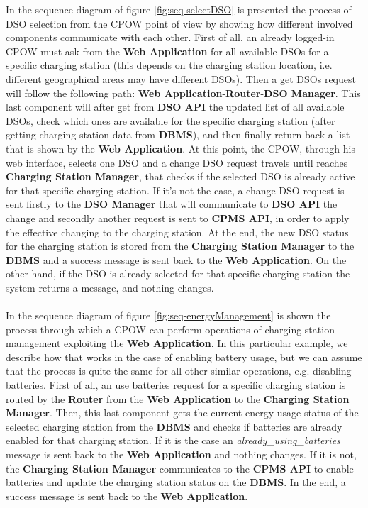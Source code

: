 \documentclass[a4paper]{report}
\begin{document}
In the sequence diagram of figure \ref{fig:seq-selectDSO} is presented the process of DSO selection from the CPOW point of view by showing how different involved components communicate with each other. First of all, an already logged-in CPOW must ask from the \textbf{Web Application} for all available DSOs for a specific charging station (this depends on the charging station location, i.e. different geographical areas may have different DSOs). Then a get DSOs request will follow the following path: \textbf{Web Application}-\textbf{Router}-\textbf{DSO Manager}. This last component will after get from \textbf{DSO API} the updated list of all available DSOs, check which ones are available for the specific charging station (after getting charging station data from \textbf{DBMS}), and then finally return back a list that is shown by the \textbf{Web Application}. At this point, the CPOW, through his web interface, selects one DSO and a change DSO request travels until reaches \textbf{Charging Station Manager}, that checks if the selected DSO is already active for that specific charging station. If it's not the case, a change DSO request is sent firstly to the \textbf{DSO Manager} that will communicate to \textbf{DSO API} the change and secondly another request is sent to \textbf{CPMS API}, in order to apply the effective changing to the charging station. At the end, the new DSO status for the charging station is stored from the \textbf{Charging Station Manager} to the \textbf{DBMS} and a success message is sent back to the \textbf{Web Application}. On the other hand, if the DSO is already selected for that specific charging station the system returns a message, and nothing changes.
\\\\
In the sequence diagram of figure \ref{fig:seq-energyManagement} is shown the process through which a CPOW can perform operations of charging station management exploiting the \textbf{Web Application}. In this particular example, we describe how that works in the case of enabling battery usage, but we can assume that the process is quite the same for all other similar operations, e.g. disabling batteries. First of all, an use batteries request for a specific charging station is routed by the \textbf{Router} from the \textbf{Web Application} to the \textbf{Charging Station Manager}. Then, this last component gets the current energy usage status of the selected charging station from the \textbf{DBMS} and checks if batteries are already enabled for that charging station. If it is the case an \textit{already\_using\_batteries} message is sent back to the \textbf{Web Application} and nothing changes. If it is not, the \textbf{Charging Station Manager} communicates to the \textbf{CPMS API} to enable batteries and update the charging station status on the \textbf{DBMS}. In the end, a success message is sent back to the \textbf{Web Application}.
\end{document}
